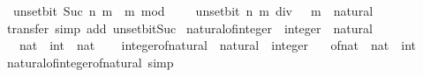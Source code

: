 \begin{isabellebody}
\ \ {\isacartoucheopen}unset{\isacharunderscore}{\kern0pt}bit\ {\isacharparenleft}{\kern0pt}Suc\ n{\isacharparenright}{\kern0pt}\ m\ {\isacharequal}{\kern0pt}\ m\ mod\ {}\ {\isacharplus}{\kern0pt}\ {}\ {\isacharasterisk}{\kern0pt}\ unset{\isacharunderscore}{\kern0pt}bit\ n\ {\isacharparenleft}{\kern0pt}m\ div\ {}{\isacharparenright}{\kern0pt}{\isacartoucheclose}\ \ m\ {\isacharcolon}{\kern0pt}{\isacharcolon}{\kern0pt}\ natural\isanewline
%
\isadelimproof
\ \ %
\endisadelimproof
%
\isatagproof
{}\isamarkupfalse%
\ {\isacharparenleft}{\kern0pt}transfer{\isacharsemicolon}{\kern0pt}\ simp\ add{\isacharcolon}{\kern0pt}\ unset{\isacharunderscore}{\kern0pt}bit{\isacharunderscore}{\kern0pt}Suc{\isacharparenright}{\kern0pt}{\isacharplus}{\kern0pt}%
\endisatagproof
{\isafoldproof}%
%
\isadelimproof
\isanewline
%
\endisadelimproof
\isanewline
{}\isamarkupfalse%
\isanewline
\isanewline
{}\isamarkupfalse%
\ natural{\isacharunderscore}{\kern0pt}of{\isacharunderscore}{\kern0pt}integer\ {\isacharcolon}{\kern0pt}{\isacharcolon}{\kern0pt}\ {\isachardoublequoteopen}integer\ {\isasymRightarrow}\ natural{\isachardoublequoteclose}\isanewline
\ \ \ {\isachardoublequoteopen}nat\ {\isacharcolon}{\kern0pt}{\isacharcolon}{\kern0pt}\ int\ {\isasymRightarrow}\ nat{\isachardoublequoteclose}\isanewline
%
\isadelimproof
\ \ %
\endisadelimproof
%
\isatagproof
\isacommand{{\isachardot}{\kern0pt}}\isamarkupfalse%
%
\endisatagproof
{\isafoldproof}%
%
\isadelimproof
\isanewline
%
\endisadelimproof
\isanewline
{}\isamarkupfalse%
\ integer{\isacharunderscore}{\kern0pt}of{\isacharunderscore}{\kern0pt}natural\ {\isacharcolon}{\kern0pt}{\isacharcolon}{\kern0pt}\ {\isachardoublequoteopen}natural\ {\isasymRightarrow}\ integer{\isachardoublequoteclose}\isanewline
\ \ \ {\isachardoublequoteopen}of{\isacharunderscore}{\kern0pt}nat\ {\isacharcolon}{\kern0pt}{\isacharcolon}{\kern0pt}\ nat\ {\isasymRightarrow}\ int{\isachardoublequoteclose}\isanewline
%
\isadelimproof
\ \ %
\endisadelimproof
%
\isatagproof
\isacommand{{\isachardot}{\kern0pt}}\isamarkupfalse%
%
\endisatagproof
{\isafoldproof}%
%
\isadelimproof
\isanewline
%
\endisadelimproof
\isanewline
{}\isamarkupfalse%
\ natural{\isacharunderscore}{\kern0pt}of{\isacharunderscore}{\kern0pt}integer{\isacharunderscore}{\kern0pt}of{\isacharunderscore}{\kern0pt}natural\ {\isacharbrackleft}{\kern0pt}simp{\isacharbrackright}{\kern0pt}{\isacharcolon}{\kern0pt}\isanewline

\end{isabellebody}
